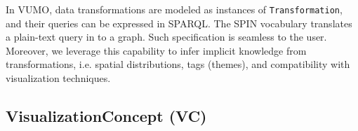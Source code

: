\documentclass[]{interact}
\theoremstyle{plain}%
\theoremstyle{definition}
\theoremstyle{remark}
\theoremstyle{definition}
\begin{document}
In VUMO, data transformations are modeled as instances of \texttt{Transformation}, and their queries can be expressed in SPARQL. The SPIN vocabulary translates a plain-text query in to a graph. Such specification is seamless to the user. Moreover, we leverage this capability to infer implicit knowledge from transformations, i.e. spatial distributions, tags (themes), and compatibility with visualization techniques.
%


%

\subsection{VisualizationConcept (VC)}
\label{sec:vc}
\end{document}
